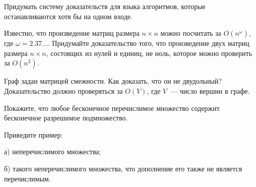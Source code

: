 \setcounter{curtask}{1}


\begin{task}
	Придумать систему доказательств для языка алгоритмов, которые останавливаются
    хотя бы на одном входе.
\end{task}

\begin{task}
    Известно, что произведение матриц размера $n \times n$ можно посчитать за
    $O(n^{\omega})$, где $\omega =  2.37...$. Придумайте доказательство того, что
    произведение двух матриц размера $n \times n$, состоящих из нулей и единиц, не ноль, которое можно проверить за
    $O(n^2)$.
\end{task}

\begin{task}
    Граф задан матрицей смежности. Как доказать, что он не двудольный? Доказательство
    должно проверяться за $O(V)$, где $V$~--- число вершин в графе.
\end{task}

\begin{task}
	Покажите, что любое бесконечное перечислимое множество содержит бесконечное
    разрешимое подмножество.    
\end{task}

\begin{task}
    Приведите пример:
    
    а) неперечислимого множества;

    б) такого неперечислимого множества, что дополнение его также не является
    перечислимым.
\end{task}